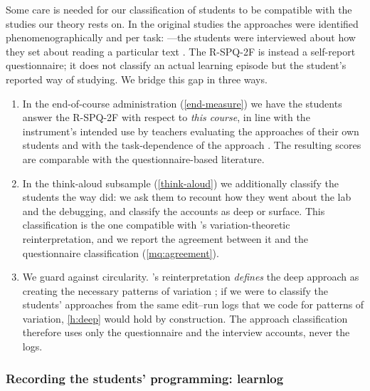 Some care is needed for our classification of students to be compatible with
the studies our theory rests on.
In the original studies the approaches were identified phenomenographically
and per task:
---the students were interviewed
about how they set about reading a particular text
\autocite{MartonSaljo1976I}.
The R-SPQ-2F is instead a self-report questionnaire; it does not classify an
actual learning episode but the student's reported way of studying.
We bridge this gap in three ways.
\begin{enumerate}
  \item In the end-of-course administration (\cref{end-measure}) we
    have the students answer the R-SPQ-2F with respect to \emph{this
    course}, in line with the instrument's intended use by teachers
    evaluating the approaches of their own students \autocite{RSPQ2F} and
    with the task-dependence of the approach \autocite{MartonSaljo1976II}.
    The resulting scores are comparable with the questionnaire-based
    literature.
  \item In the think-aloud subsample (\cref{think-aloud}) we additionally
    classify the students the way \textcite{MartonSaljo1976I} did: we ask them to recount how they
    went about the lab and the debugging, and classify the accounts as deep
    or surface.
    This classification is the one compatible with \citeauthor{NCOL}'s
    variation-theoretic reinterpretation, and we report the agreement between
    it and the questionnaire classification (\cref{mq:agreement}).
  \item We guard against circularity.
    's reinterpretation \emph{defines} the deep approach as
    creating the necessary patterns of variation
    \autocite[p.~145]{NCOL}; if we were to classify the students' approaches
    from the same edit--run logs that we code for patterns of variation,
    \cref{h:deep} would hold by construction.
    The approach classification therefore uses only the questionnaire and the
    interview accounts, never the logs.
\end{enumerate}

\subsubsection{Recording the students' programming: learnlog}
\label{learnlog-data}


